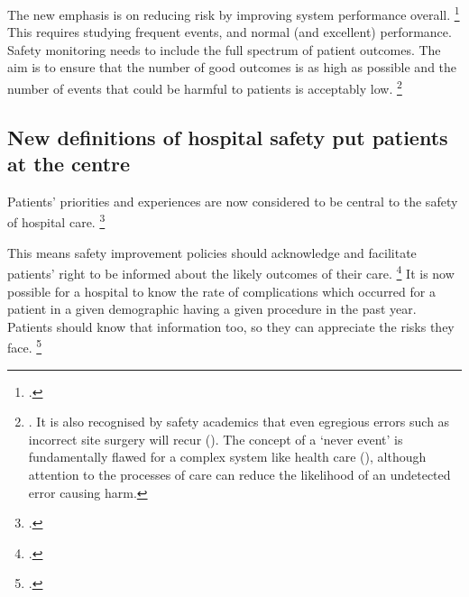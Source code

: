 \documentclass[FrontPage]{grattan}
\begin{document}
The new emphasis is on reducing risk by improving system performance overall.%
	\footcites{Hollnagel-2014-Safety-Management}{Besnard2014}{DEKKER2014348}
This requires studying frequent events, and normal (and excellent) performance.
Safety monitoring needs to include the full spectrum of patient outcomes.
The aim is to ensure that the number of good outcomes is as high as possible and the number of events that could be harmful to patients is acceptably low.%
	\footnote{\textcite{Hollnagel-2014-Safety-Management}.
	It is also recognised by safety academics that even egregious errors such as incorrect site surgery will recur (\textcite{pandit2016deaths}).
	The concept of a `never event' is fundamentally flawed for a complex system like health care (\textcite{moppett2016surgical}), although attention to the processes of care can reduce the likelihood of an undetected error causing harm.}

\subsection{New definitions of hospital safety put patients at the centre}\label{subsec:new-definitions-of-hospital-safety-put-patients-at-the-centre}
Patients' priorities and experiences are now considered to be central to the safety of hospital care.%
	\footcites{jorm2009should}{hor2013finding}{pronovost2017creating}

This means safety improvement policies should acknowledge and facilitate patients' right to be informed about the likely outcomes of their care.%
	\footcite{Rubin-2017-Patient-empowerment}
It is now possible for a hospital to know the rate of complications which occurred for a patient in a given demographic having a given procedure in the past year.
Patients should know that information too, so they can appreciate the risks they face.%
	\footcite{Stacey_2017}
\end{document}
